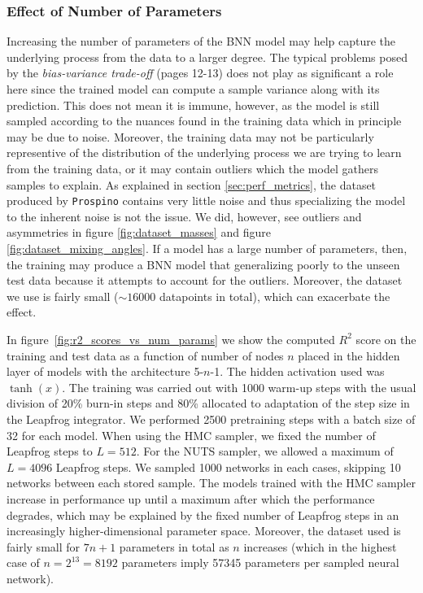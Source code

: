 \subsubsection{Effect of Number of Parameters}
Increasing the number of parameters of the BNN model may help capture the underlying process from the data to a larger degree. The typical problems posed by the \textit{bias-variance trade-off} \cite{ml_for_physicists} (pages 12-13) does not play as significant a role here since the trained model can compute a sample variance along with its prediction. This does not mean it is immune, however, as the model is still sampled according to the nuances found in the training data which in principle may be due to noise. Moreover, the training data may not be particularly representive of the distribution of the underlying process we are trying to learn from the training data, or it may contain outliers which the model gathers samples to explain. As explained in section \ref{sec:perf_metrics}, the dataset produced by {\tt Prospino} contains very little noise and thus specializing the model to the inherent noise is not the issue. We did, however, see outliers and asymmetries in figure \ref{fig:dataset_masses} and figure \ref{fig:dataset_mixing_angles}. If a model has a large number of parameters, then, the training may produce a BNN model that generalizing poorly to the unseen test data because it attempts to account for the outliers. Moreover, the dataset we use is fairly small ($\sim 16000$ datapoints in total), which can exacerbate the effect.

In figure~\ref{fig:r2_scores_vs_num_params} we show the computed $R^2$ score on the training and test data as a function of number of nodes $n$ placed in the hidden layer of models with the architecture 5-$n$-1. The hidden activation used was $\tanh(x)$. The training was carried out with 1000 warm-up steps with the usual division of 20\% burn-in steps and 80\% allocated to adaptation of the step size in the Leapfrog integrator. We performed 2500 pretraining steps with a batch size of 32 for each model. When using the HMC sampler, we fixed the number of Leapfrog steps to $L = 512$. For the NUTS sampler, we allowed a maximum of $L = 4096$ Leapfrog steps. We sampled 1000 networks in each cases, skipping 10 networks between each stored sample. The models trained with the HMC sampler increase in performance up until a maximum after which the performance degrades, which may be explained by the fixed number of Leapfrog steps in an increasingly higher-dimensional parameter space. Moreover, the dataset used is fairly small for $7n + 1$ parameters in total as $n$ increases (which in the highest case of $n = 2^{13} = 8192$ parameters imply 57345 parameters per sampled neural network). 

